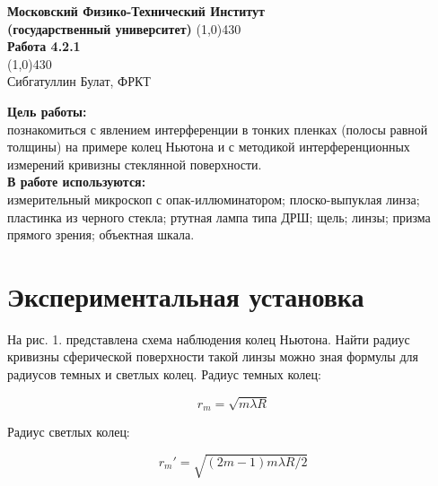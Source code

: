 \documentclass[a4paper, 12pt]{article}%
\begin{document}
\begin{titlepage}

\begin{center}
\large\textbf{Московский Физико-Технический Институт}\\
\large\textbf{(государственный университет)}
\vfill
\line(1,0){430}\\[1mm]
\huge\textbf{Работа 4.2.1}\\
\line(1,0){430}\\[1mm]
\vfill
\large Сибгатуллин Булат, ФРКТ\\
\end{center}

\end{titlepage}
\noindent \textbf{Цель работы:} \\
\indent познакомиться с явлением интерференции в тонких пленках (полосы равной толщины) на примере колец Ньютона и с методикой интерференционных измерений кривизны стеклянной поверхности.\\
\noindent \textbf{В работе используются:} \\
\indent измерительный микроскоп с опак-иллюминатором; плоско-выпуклая линза; пластинка из черного стекла; ртутная лампа типа ДРШ; щель; линзы; призма прямого зрения; объектная шкала.

\section*{Экспериментальная установка}

На рис. 1. представлена схема наблюдения колец Ньютона. Найти радиус кривизны сферической поверхности такой линзы можно зная формулы для радиусов темных и светлых колец. Радиус темных колец:

\begin{equation}
r_m = \sqrt{m \lambda R}
\end{equation}

Радиус светлых колец:

\begin{equation}
r_m' = \sqrt{(2m - 1) m\lambda R/2}
\end{equation}
\end{document}

